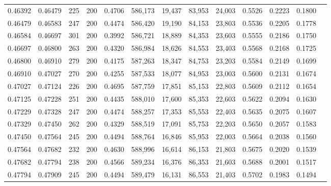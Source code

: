 \begin{tabular}{rrrrrrrrrrrrr}
0.46392 & 0.46479 &    225 & 200 &                                     0.4706 & 586,173 &  19,437 &  83,953 &  24,003 & 0.5526 & 0.2223 & 0.1800 \\
0.46479 & 0.46583 &    247 & 200 &                                     0.4474 & 586,420 &  19,190 &  84,153 &  23,803 & 0.5536 & 0.2205 & 0.1778 \\
0.46584 & 0.46697 &    301 & 200 &                                     0.3992 & 586,721 &  18,889 &  84,353 &  23,603 & 0.5555 & 0.2186 & 0.1750 \\
0.46697 & 0.46800 &    263 & 200 &                                     0.4320 & 586,984 &  18,626 &  84,553 &  23,403 & 0.5568 & 0.2168 & 0.1725 \\
0.46800 & 0.46910 &    279 & 200 &                                     0.4175 & 587,263 &  18,347 &  84,753 &  23,203 & 0.5584 & 0.2149 & 0.1699 \\
0.46910 & 0.47027 &    270 & 200 &                                     0.4255 & 587,533 &  18,077 &  84,953 &  23,003 & 0.5600 & 0.2131 & 0.1674 \\
0.47027 & 0.47124 &    226 & 200 &                                     0.4695 & 587,759 &  17,851 &  85,153 &  22,803 & 0.5609 & 0.2112 & 0.1654 \\
0.47125 & 0.47228 &    251 & 200 &                                     0.4435 & 588,010 &  17,600 &  85,353 &  22,603 & 0.5622 & 0.2094 & 0.1630 \\
0.47229 & 0.47328 &    247 & 200 &                                     0.4474 & 588,257 &  17,353 &  85,553 &  22,403 & 0.5635 & 0.2075 & 0.1607 \\
0.47329 & 0.47450 &    262 & 200 &                                     0.4329 & 588,519 &  17,091 &  85,753 &  22,203 & 0.5650 & 0.2057 & 0.1583 \\
0.47450 & 0.47564 &    245 & 200 &                                     0.4494 & 588,764 &  16,846 &  85,953 &  22,003 & 0.5664 & 0.2038 & 0.1560 \\
0.47564 & 0.47682 &    232 & 200 &                                     0.4630 & 588,996 &  16,614 &  86,153 &  21,803 & 0.5675 & 0.2020 & 0.1539 \\
0.47682 & 0.47794 &    238 & 200 &                                     0.4566 & 589,234 &  16,376 &  86,353 &  21,603 & 0.5688 & 0.2001 & 0.1517 \\
0.47794 & 0.47909 &    245 & 200 &                                     0.4494 & 589,479 &  16,131 &  86,553 &  21,403 & 0.5702 & 0.1983 & 0.1494 \\

\end{tabular}
